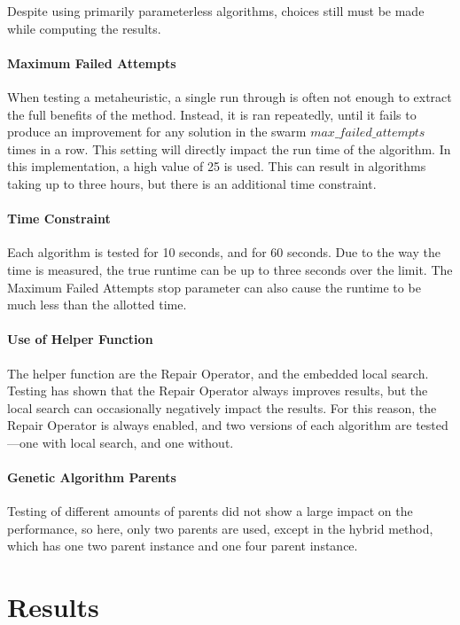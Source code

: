 \documentclass[11pt, letterpaper, onecolumn]{article}
\begin{document}
Despite using primarily parameterless algorithms, choices still must be made while computing the results. 

\paragraph{Maximum Failed Attempts}

When testing a metaheuristic, a single run through is often not enough to extract the full benefits of the method. Instead, it is ran repeatedly, until it fails to produce an improvement for any solution in the swarm $max\_failed\_attempts$ times in a row. This setting will directly impact the run time of the algorithm. In this implementation, a high value of 25 is used. This can result in algorithms taking up to three hours, but there is an additional time constraint. 

\paragraph{Time Constraint}

Each algorithm is tested for 10 seconds, and for 60 seconds. Due to the way the time is measured, the true runtime can be up to three seconds over the limit. The Maximum Failed Attempts stop parameter can also cause the runtime to be much less than the allotted time. 

\paragraph{Use of Helper Function}

The helper function are the Repair Operator, and the embedded local search. Testing has shown that the Repair Operator always improves results, but the local search can occasionally negatively impact the results. For this reason, the Repair Operator is always enabled, and two versions of each algorithm are tested---one with local search, and one without. 

\paragraph{Genetic Algorithm Parents}

Testing of different amounts of parents did not show a large impact on the performance, so here, only two parents are used, except in the hybrid method, which has one two parent instance and one four parent instance. 

\section{Results}
\end{document}
